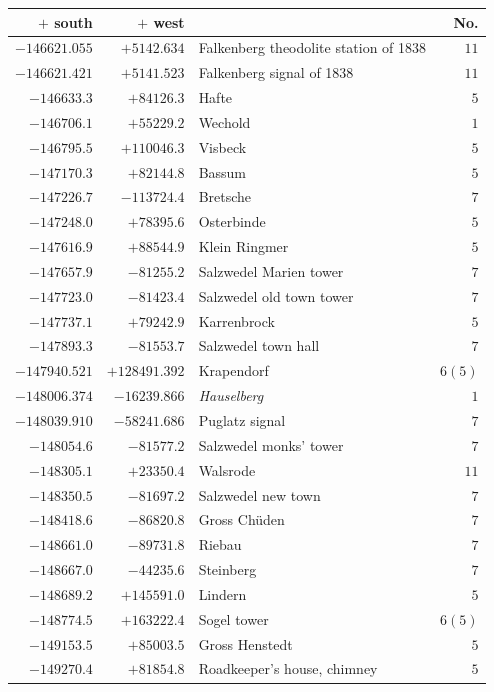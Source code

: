 \clearpage{}%
\begin{center}\begingroup\fontsize{8}{9}\selectfont
\setlength{\tabcolsep}{4pt}
\begin{tabular}{r|r|p{170pt}|r}\hline
\(+\) south&\(+\) west&&No.\\\hline
\(-146621.055\)&\(+5142.634\)&Falkenberg theodolite station of 1838&\(11\)\\
\(-146621.421\)&\(+5141.523\)&Falkenberg signal of 1838&\(11\)\\
\(-146633.3\)&\(+84126.3\)&Hafte&\(5\)\\
\(-146706.1\)&\(+55229.2\)&Wechold&\(1\)\\
\(-146795.5\)&\(+110046.3\)&Visbeck&\(5\)\\
\(-147170.3\)&\(+82144.8\)&Bassum&\(5\)\\
\(-147226.7\)&\(-113724.4\)&Bretsche&\(7\)\\
\(-147248.0\)&\(+78395.6\)&Osterbinde&\(5\)\\
\(-147616.9\)&\(+88544.9\)&Klein Ringmer&\(5\)\\
\(-147657.9\)&\(-81255.2\)&Salzwedel Marien tower&\(7\)\\
\(-147723.0\)&\(-81423.4\)&Salzwedel old town tower&\(7\)\\
\(-147737.1\)&\(+79242.9\)&Karrenbrock&\(5\)\\
\(-147893.3\)&\(-81553.7\)&Salzwedel town hall&\(7\)\\
\(-147940.521\)&\(+128491.392\)&Krapendorf&\(6 (5)\)\\
\(-148006.374\)&\(-16239.866\)&\textit{Hauselberg}&\(1\)\\
\(-148039.910\)&\(-58241.686\)&Puglatz signal&\(7\)\\
\(-148054.6\)&\(-81577.2\)&Salzwedel monks’ tower&\(7\)\\
\(-148305.1\)&\(+23350.4\)&Walsrode&\(11\)\\
\(-148350.5\)&\(-81697.2\)&Salzwedel new town&\(7\)\\
\(-148418.6\)&\(-86820.8\)&Gross Chüden&\(7\)\\
\(-148661.0\)&\(-89731.8\)&Riebau&\(7\)\\
\(-148667.0\)&\(-44235.6\)&Steinberg&\(7\)\\
\(-148689.2\)&\(+145591.0\)&Lindern&\(5\)\\
\(-148774.5\)&\(+163222.4\)&Sogel tower&\(6 (5)\)\\
\(-149153.5\)&\(+85003.5\)&Gross Henstedt&\(5\)\\
\(-149270.4\)&\(+81854.8\)&Roadkeeper’s house, chimney&\(5\)\\

\end{tabular}
\end{center}
